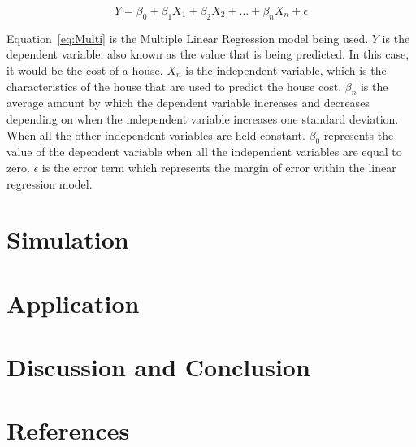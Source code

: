 \documentclass[12pt]{article}
\begin{document}
\begin{equation}
  \label{eq:Multi}
  Y = \beta_{0} + \beta_{1}X_{1} + \beta_{2}X_{2} + ... + \beta_{n}X_{n} + \epsilon
\end{equation}

Equation~\ref{eq:Multi} is the Multiple Linear Regression model being used. \(Y\) is the dependent variable, also known as the value that is being predicted. In this case, it would be the cost of a house. \(X_{n}\) is the independent variable, which is the characteristics of the house that are used to predict the house cost. \(\beta_{n}\) is the average amount by which the dependent variable increases and decreases depending on when the independent variable increases one standard deviation. When all the other independent variables are held constant. \(\beta_{0}\) represents the value of the dependent variable when all the independent variables are equal to zero. \(\epsilon\) is the error term which represents the margin of error within the linear regression model. 

\section{Simulation}
\label{sec:sim}


\section{Application}
\label{sec:app}


\section{Discussion and Conclusion}
\label{sec:disc}



\section{References}
\label{sec:refer}

\end{document}
